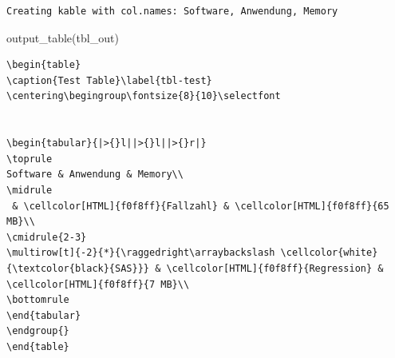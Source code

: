 \documentclass[
  german,
  10pt,
  twoside]{article}
\newenvironment{Shaded}{\begin{snugshade}}{\end{snugshade}}
\newcommand{\FunctionTok}[1]{\textcolor[rgb]{0.28,0.35,0.67}{#1}}
\newcommand{\NormalTok}[1]{\textcolor[rgb]{0.00,0.23,0.31}{#1}}
\begin{document}
\begin{verbatim}
Creating kable with col.names: Software, Anwendung, Memory
\end{verbatim}

\begin{Shaded}
\begin{Highlighting}[]
\FunctionTok{output\_table}\NormalTok{(tbl\_out)}
\end{Highlighting}
\end{Shaded}

\begin{verbatim}
\begin{table}
\caption{Test Table}\label{tbl-test}
\centering\begingroup\fontsize{8}{10}\selectfont


\begin{tabular}{|>{}l||>{}l||>{}r|}
\toprule
Software & Anwendung & Memory\\
\midrule
 & \cellcolor[HTML]{f0f8ff}{Fallzahl} & \cellcolor[HTML]{f0f8ff}{65 MB}\\
\cmidrule{2-3}
\multirow[t]{-2}{*}{\raggedright\arraybackslash \cellcolor{white}{\textcolor{black}{SAS}}} & \cellcolor[HTML]{f0f8ff}{Regression} & \cellcolor[HTML]{f0f8ff}{7 MB}\\
\bottomrule
\end{tabular}
\endgroup{}
\end{table}
\end{verbatim}


\printbibliography
\end{document}
